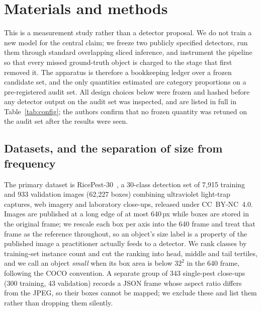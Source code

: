 \section{Materials and methods}\label{sec:methods}

This is a measurement study rather than a detector proposal. We do not train a new model for the central claim; we freeze two publicly specified detectors, run them through standard overlapping sliced inference, and instrument the pipeline so that every missed ground-truth object is charged to the stage that first removed it. The apparatus is therefore a bookkeeping ledger over a frozen candidate set, and the only quantities estimated are category proportions on a pre-registered audit set. All design choices below were frozen and hashed before any detector output on the audit set was inspected, and are listed in full in Table~\ref{tab:config}; the authors confirm that no frozen quantity was retuned on the audit set after the results were seen.

\subsection{Datasets, and the separation of size from frequency}\label{sec:data}

The primary dataset is RicePest-30~\citep{mo2025ricepest}, a 30-class detection set of 7{,}915 training and 933 validation images (62{,}227 boxes) combining ultraviolet light-trap captures, web imagery and laboratory close-ups, released under CC~BY-NC~4.0. Images are published at a long edge of at most 640\,px while boxes are stored in the original frame; we rescale each box per axis into the 640 frame and treat that frame as the reference throughout, so an object's size label is a property of the published image a practitioner actually feeds to a detector. We rank classes by training-set instance count and cut the ranking into head, middle and tail tertiles, and we call an object \emph{small} when its box area is below $32^2$ in the 640 frame, following the COCO convention. A separate group of 343 single-pest close-ups (300 training, 43 validation) records a JSON frame whose aspect ratio differs from the JPEG, so their boxes cannot be mapped; we exclude these and list them rather than dropping them silently.

